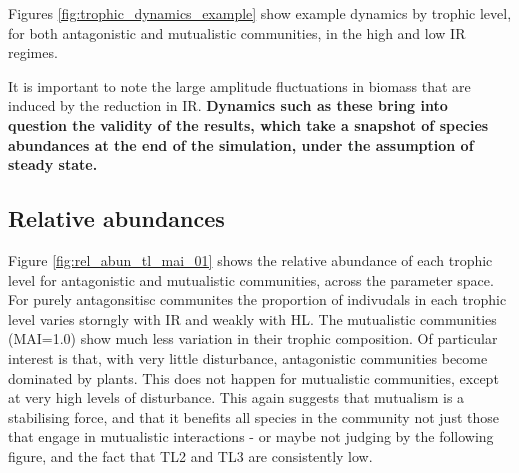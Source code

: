 \begin{itemize}
\begin{figure}
\end{figure}

Figures \ref{fig:trophic_dynamics_example} show example dynamics by trophic level, for both antagonistic and mutualistic communities, in the high and low IR regimes. 

It is important to note the large amplitude fluctuations in biomass that are induced by the reduction in IR. \textbf{Dynamics such as these bring into question the validity of the results, which take a snapshot of species abundances at the end of the simulation, under the assumption of steady state.} 


\subsection{Relative abundances}
\label{sec:rel_abun}

Figure \ref{fig:rel_abun_tl_mai_01} shows the relative abundance of each trophic level for antagonistic and mutualistic communities, across the parameter space.  For purely antagonsitisc communites the proportion of indivudals in each trophic level varies storngly with IR and weakly with HL.  The mutualistic communities (MAI=1.0) show much less variation in their trophic composition. Of particular interest is that, with very little disturbance, antagonistic communities become dominated by plants. This does not happen for mutualistic communities, except at very high levels of disturbance. This again suggests that mutualism is a stabilising force, and that it benefits all species in the community not just those that engage in mutualistic interactions - or maybe not judging by the following figure, and the fact that TL2 and TL3 are consistently low.


\end{itemize}
